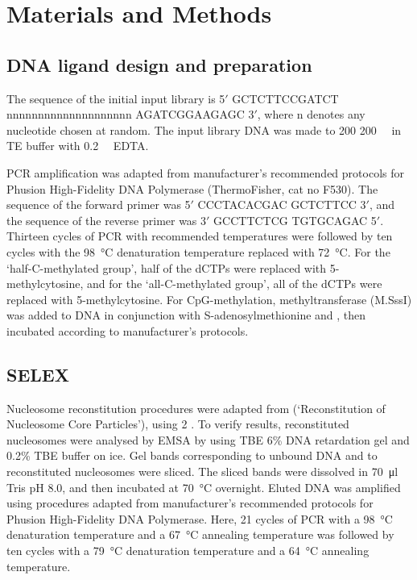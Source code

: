 \documentclass[parskip=full, numbers=noenddot]{scrreprt}
\begin{document}
\section{Materials and Methods}
\label{sec:emsaselex_methods}

\subsection{DNA ligand design and preparation}
\label{ssec:emsaselex_methods_lig}

The sequence of the initial input library is 5$'$ GCTCTTCCGATCT nnnnnnnnnnnnnnnnnnnn AGATCGGAAGAGC 3$'$, where n denotes any nucleotide chosen at random. The input library DNA was made to 200 \SI{200}{\nano\Molar} in TE buffer with \SI{0.2}{\milli\Molar} EDTA.

PCR amplification was adapted from manufacturer's recommended protocols for Phusion High-Fidelity DNA Polymerase (ThermoFisher, cat no F530).  The sequence of the forward primer was 5$'$ CCCTACACGAC GCTCTTCC 3$'$, and the sequence of the reverse primer was 3$'$ GCCTTCTCG TGTGCAGAC 5$'$.  Thirteen cycles of PCR with recommended temperatures were followed by ten cycles with the \SI{98}{\celsius} denaturation temperature replaced with \SI{72}{\celsius}.  For the `half-C-methylated group', half of the dCTPs were replaced with 5-methylcytosine, and for the `all-C-methylated group', all of the dCTPs were replaced with 5-methylcytosine.   For CpG-methylation, methyltransferase (M.SssI) was added to DNA in conjunction with S-adenosylmethionine and , then incubated according to manufacturer's protocols.

\subsection{SELEX}
\label{ssec:emsaselex_methods_selex}

Nucleosome reconstitution procedures were adapted from \citet{dyer_reconstitution_2003} (`Reconstitution of Nucleosome Core Particles'), using \SI{2}{\Molar} .  To verify results, reconstituted nucleosomes were analysed by EMSA by using TBE 6\% DNA retardation gel and 0.2\% TBE buffer on ice.  Gel bands corresponding to unbound DNA and to reconstituted nucleosomes were sliced.  The sliced bands were dissolved in \SI{70}{\micro\litre} Tris pH 8.0, and then incubated at \SI{70}{\celsius} overnight.  Eluted DNA was amplified using procedures adapted from manufacturer's recommended protocols for Phusion High-Fidelity DNA Polymerase.  Here, 21 cycles of PCR with a \SI{98}{\celsius} denaturation temperature and a \SI{67}{\celsius} annealing temperature was followed by ten cycles with a \SI{79}{\celsius} denaturation temperature and a \SI{64}{\celsius} annealing temperature.
\end{document}
